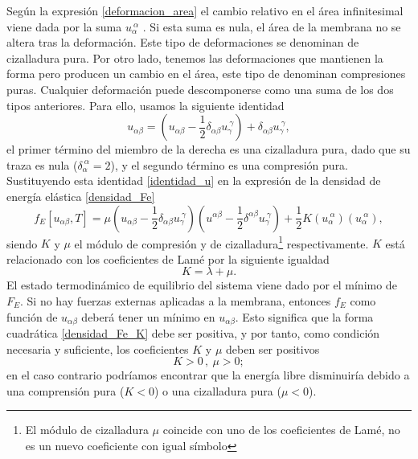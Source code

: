 Según la expresión \eqref{deformacion_area} el cambio relativo en el área infinitesimal
viene dada por la suma $u_{\alpha}^{\ \alpha}$ . Si esta suma es nula, el área
de la membrana no se altera tras la deformación. Este tipo de deformaciones se
denominan de cizalladura pura. Por otro lado, tenemos las deformaciones que
mantienen la forma pero producen un cambio en el área, este tipo de denominan
compresiones puras. Cualquier deformación puede descomponerse como una suma de
los dos tipos anteriores. Para ello, usamos la siguiente identidad
\begin{equation}\label{identidad_u}
u_{\alpha\beta}=(u_{\alpha\beta}-\frac{1}{2}\delta_{\alpha\beta}u_{\gamma}^{\
  \gamma})+\delta_{\alpha\beta}u_{\gamma}^{\ \gamma},
\end{equation}
el primer término del miembro de la derecha es una cizalladura pura, dado que
su traza es nula ($\delta_{\alpha}^{\ \alpha}=2$), y el segundo término es una
compresión pura. Sustituyendo esta identidad \eqref{identidad_u} en la expresión de la densidad de
energía elástica \eqref{densidad_Fe}
\begin{equation}\label{densidad_Fe_K}
f_E[u_{\alpha\beta},T]=
\mu \left(u_{\alpha\beta}-\frac{1}{2}\delta_{\alpha\beta}u_{\gamma}^{\ \gamma}\right)
    \left(u^{\alpha\beta}-\frac{1}{2}\delta^{\alpha\beta}u_{\gamma}^{\ \gamma}\right)+
\frac{1}{2}K(u_{\alpha}^{\ \alpha})(u_{\alpha}^{\ \alpha}),
\end{equation}
siendo $K$ y $\mu$ el módulo de compresión y de
cizalladura\footnote{El módulo de cizalladura $\mu$ coincide con uno de los
  coeficientes de Lamé, no es un nuevo coeficiente con igual símbolo} respectivamente. $K$
está relacionado con los coeficientes de Lamé por la siguiente igualdad
\begin{equation*}
K=\lambda+\mu.
\end{equation*}
El estado termodinámico de equilibrio del sistema viene dado por el mínimo de
$F_E$. Si no hay fuerzas externas aplicadas a la membrana, entonces $f_E$ como
función de $u_{\alpha\beta}$ deberá tener un mínimo en $u_{\alpha\beta}$. Esto
significa que la forma cuadrática \eqref{densidad_Fe_K} debe ser positiva, y por
tanto, como condición necesaria y suficiente, los coeficientes $K$ y $\mu$ deben ser positivos
\begin{equation*}
K>0\, ,\ \mu>0;
\end{equation*}
en el caso contrario podríamos encontrar que la energía libre disminuiría debido a una
comprensión pura ($K<0$) o una cizalladura pura ($\mu<0$).

